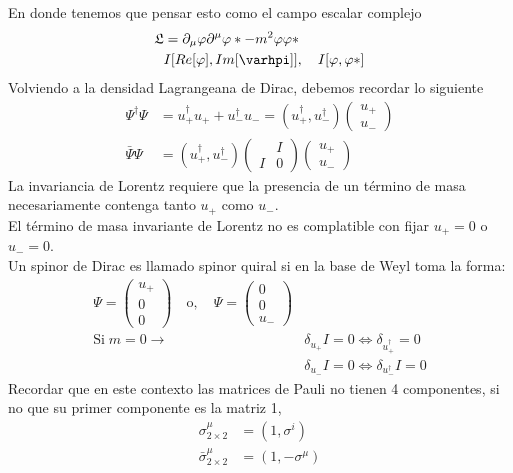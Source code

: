 \documentclass[../main.tex]{subfiles}
\begin{document}
En donde tenemos que pensar esto como el campo escalar complejo
\begin{align*}
  \mathfrak{L} & = \partial_\mu \varphi \partial^\mu \varphi* - m^2 \varphi \varphi* \\
  & I[Re[\varphi],Im[\varhpi]] , \quad I[\varphi,\varphi*]
\end{align*}
Volviendo a la densidad Lagrangeana de Dirac, debemos recordar lo siguiente
\begin{align*}
  \Psi^\dagger \Psi & = u^\dagger_+ u_+ + u^\dagger_- u_- = \left( u_+^\dagger , u^\dagger_- \right) \begin{pmatrix}
    u_+ \\ u_-
  \end{pmatrix} \\
  \bar{\Psi}\Psi & = \left( u_+^\dagger , u_-^\dagger \right) \begin{pmatrix}
     & I \\ I & 0 
  \end{pmatrix}
  \begin{pmatrix}
    u_+ \\ u_-
  \end{pmatrix}
\end{align*}
La invariancia de Lorentz requiere que la presencia de un término de masa necesariamente contenga tanto $u_+$ como $u_-$.\\
El término de masa invariante de Lorentz no es complatible con fijar $u_+=0$ o $u_-=0$. \\
Un spinor de Dirac es llamado spinor quiral si en la base de Weyl toma la forma:
\begin{align*}
  \Psi = \begin{pmatrix}
    u_+ \\ 0 \\ 0 
  \end{pmatrix}
  \quad \text{o}, \quad \Psi= \begin{pmatrix}
    0 \\ 0 \\ u_-
  \end{pmatrix} \\
  \text{Si} \; m=0 \rightarrow & \delta_{u_+} I = 0 \Leftrightarrow \delta_{u^\dagger_+} = 0 \\
  & \delta_{u_-} I = 0 \Leftrightarrow \delta_{u_-^\dagger} I = 0
\end{align*}
Recordar que en este contexto las matrices de Pauli no tienen 4 componentes, si no que su primer componente es la matriz 1,
\begin{align*}
  \sigma_{2\times 2}^\mu & = \left( 1, \sigma^i \right) \\
  \bar{\sigma}_{2\times 2}^\mu & = \left( 1,-\sigma^\mu \right)
\end{align*}
\end{document}
